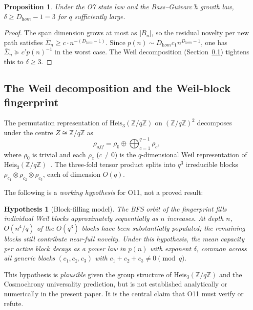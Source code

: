 \documentclass[11pt,a4paper]{article}
\newtheorem{proposition}[theorem]{Proposition}
\newtheorem{hypothesis}[theorem]{Hypothesis}
\newcommand{\Heis}{\mathrm{Heis}_3(\mathbb{Z}/q\mathbb{Z})}
\begin{document}
    \begin{proposition}\label{prop:lower}
      Under the O7 state law and the Bass--Guivarc'h growth law,
      $\delta \geq D_{\mathrm hom} - 1 = 3$ for $q$ sufficiently large.
    \end{proposition}

    \begin{proof}
      The span dimension grows at most as $|B_n|$, so the residual novelty per
      new path satisfies $\bar\Sigma_n \geq c \cdot n^{-(D_{\mathrm hom}-1)}$.
      Since $p(n) \sim D_{\mathrm hom} c_1 n^{D_{\mathrm hom}-1}$,
      one has $\bar\Sigma_n \succcurlyeq c' p(n)^{-1}$ in the worst case.
      The Weil decomposition (Section~\ref{sec:weil}) tightens this to $\delta \geq 3$.
    \end{proof}

  \subsection{The Weil decomposition and the Weil-block fingerprint}
    \label{sec:weil}

    The permutation representation of $\Heis$ on $(\mathbb{Z}/q\mathbb{Z})^2$
    decomposes under the centre $Z \cong \mathbb{Z}/q\mathbb{Z}$ as
    \[
      \rho_{\mathrm aff} = \rho_0 \oplus \bigoplus_{c=1}^{q-1} \rho_c,
    \]
    where $\rho_0$ is trivial and each $\rho_c$ ($c \neq 0$) is the
    $q$-dimensional Weil representation of $\Heis$~\cite{Weil}.
    The three-fold tensor product splits into $q^3$ irreducible blocks
    $\rho_{c_1} \otimes \rho_{c_2} \otimes \rho_{c_3}$, each of dimension $O(q)$.

    The following is a \emph{working hypothesis} for O11, not a proved result:
    \begin{hypothesis}[Block-filling model]\label{hyp:weil}
      The BFS orbit of the fingerprint fills individual Weil blocks
      approximately sequentially as $n$ increases.
      At depth $n$, $O(n^4/q)$ of the $O(q^3)$ blocks have been substantially
      populated; the remaining blocks still contribute near-full novelty.
      Under this hypothesis, the mean capacity per active block decays as
      a power law in $p(n)$ with exponent $\delta$, common across all
      generic blocks $(c_1, c_2, c_3)$ with $c_1 + c_2 + c_3 \neq 0 \pmod{q}$.
    \end{hypothesis}

    This hypothesis is \emph{plausible} given the group structure of $\Heis$
    and the Cosmochrony universality prediction, but is not established
    analytically or numerically in the present paper.
    It is the central claim that O11 must verify or refute.
\end{document}

